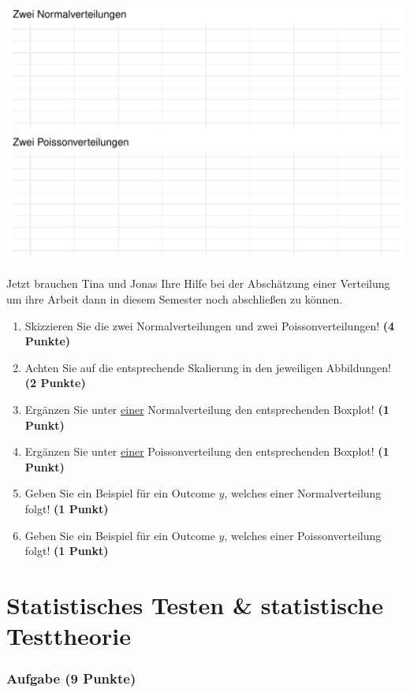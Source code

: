 \documentclass[a4paper, 9pt]{scrartcl}\usepackage[]{graphicx}\usepackage[]{xcolor}
\makeatletter
\def\maxwidth{ %
  \ifdim\Gin@nat@width>\linewidth
    \linewidth
  \else
    \Gin@nat@width
  \fi
}
\makeatother
\begin{document}
{\centering \includegraphics[width=\maxwidth]{img/histogram-01-1} 

}




Jetzt brauchen Tina und Jonas Ihre Hilfe bei der Abschätzung einer Verteilung um ihre Arbeit dann in diesem Semester noch abschließen zu können.


\begin{enumerate}
\item Skizzieren Sie die zwei Normalverteilungen und zwei Poissonverteilungen! \textbf{(4 Punkte)}
\item Achten Sie auf die entsprechende Skalierung in den jeweiligen Abbildungen! \textbf{(2 Punkte)}
\item Ergänzen Sie unter \underline{einer} Normalverteilung den entsprechenden Boxplot! \textbf{(1 Punkt)}
\item Ergänzen Sie unter \underline{einer} Poissonverteilung den entsprechenden Boxplot! \textbf{(1 Punkt)}
\item Geben Sie ein Beispiel für ein Outcome $y$, welches einer Normalverteilung folgt! \textbf{(1 Punkt)}
\item Geben Sie ein Beispiel für ein Outcome $y$, welches einer Poissonverteilung folgt! \textbf{(1 Punkt)}
\end{enumerate} 
\clearpage
\part{Statistisches Testen \& statistische Testtheorie}

\section{Aufgabe \hfill (9 Punkte)}
\end{document}
